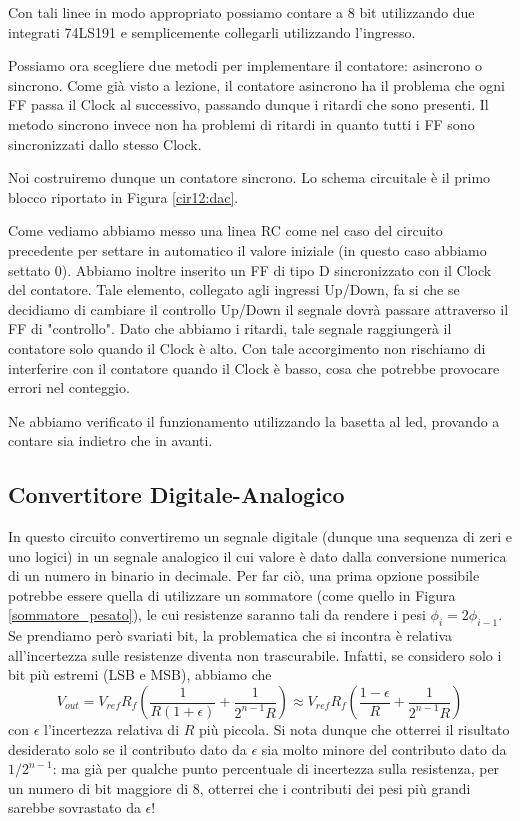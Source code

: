 Con tali linee in modo appropriato possiamo contare a 8 bit utilizzando due integrati 74LS191 e semplicemente collegarli utilizzando l'ingresso.

Possiamo ora scegliere due metodi per implementare il contatore: asincrono o sincrono. Come già visto a lezione, il contatore asincrono ha il problema che ogni FF passa il Clock al successivo, passando dunque i ritardi che sono presenti. Il metodo sincrono invece non ha problemi di ritardi in quanto tutti i FF sono sincronizzati dallo stesso Clock. 

Noi costruiremo dunque un contatore sincrono. Lo schema circuitale è il primo blocco riportato in Figura \ref{cir12:dac}.

Come vediamo abbiamo messo una linea RC come nel caso del circuito precedente per settare in automatico il valore iniziale (in questo caso abbiamo settato 0). Abbiamo inoltre inserito un FF di tipo D sincronizzato con il Clock del contatore. Tale elemento,  collegato agli ingressi Up/Down, fa si che se decidiamo di cambiare il controllo Up/Down il segnale dovrà passare attraverso il FF di "controllo". Dato che abbiamo i ritardi, tale segnale raggiungerà il contatore solo  quando il Clock è alto. Con tale accorgimento non rischiamo di interferire con il contatore quando il Clock è basso, cosa che potrebbe provocare errori nel conteggio.

Ne abbiamo verificato il funzionamento utilizzando la basetta al led, provando a contare sia indietro che in avanti. 

\subsection{Convertitore Digitale-Analogico}

In questo circuito convertiremo un segnale digitale (dunque una sequenza di zeri e uno logici) in un segnale analogico il cui valore è dato dalla conversione numerica di un numero in binario in decimale. Per far ciò, una prima opzione possibile potrebbe essere quella di utilizzare un sommatore (come quello in Figura \ref{sommatore_pesato}), le cui resistenze saranno tali da rendere i pesi $\phi_i = 2 \phi_{i -1}$. Se prendiamo però svariati bit, la problematica che si incontra è relativa all'incertezza sulle resistenze diventa non trascurabile. Infatti, se considero solo i bit più estremi (LSB e MSB), abbiamo che
$$V_{out}=V_{ref} R_f \left( \frac{1}{R (1 + \epsilon)} + \frac{1}{2^{n-1}R}\right) \approx V_{ref} R_f \left( \frac{1 - \epsilon}{R} + \frac{1}{2^{n-1}R}\right)$$
con $\epsilon$ l'incertezza relativa di $R$ più piccola. Si nota dunque che otterrei il risultato desiderato solo se il contributo dato da $\epsilon$ sia molto minore del contributo dato da $1/2^{n-1}$: ma già per qualche punto percentuale di incertezza sulla resistenza, per un numero di bit maggiore di 8, otterrei che i contributi dei pesi più grandi sarebbe sovrastato da $\epsilon$!

